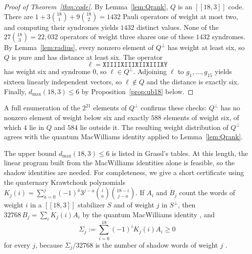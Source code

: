 \documentclass[11pt]{article}
\theoremstyle{definition}
\theoremstyle{remark}
\newcommand{\qc}[1]{[\![#1]\!]}
\begin{document}
\begin{proof}[Proof of Theorem~\ref{thm:code}]
By Lemma~\ref{lem:Qrank}, \(Q\) is an \(\qc{18,3}\) code. There are
\(1+3\binom{18}{1}+9\binom{18}{2}=1432\) Pauli operators of weight at
most two, and computing their syndromes yields \(1432\) distinct values.
None of the \(27\binom{18}{3}=22{,}032\) operators of weight three
shares one of these \(1432\) syndromes. By Lemma~\ref{lem:radius}, every
nonzero element of \(Q^\perp\) has weight at least six, so \(Q\) is pure
and has distance at least six. The operator
\[
 \ell=\texttt{XIIIIXIIIXIIXIIIXY}
\]
has weight six and syndrome \(0\), so \(\ell\in Q^\perp\). Adjoining
\(\ell\) to \(g_1,\ldots,g_{15}\) yields sixteen linearly independent
vectors, so \(\ell\notin Q\) and the distance is exactly six. Finally,
\(d_{\max}(18,3)\leq6\) by Proposition~\ref{prop:ub18} below.
\end{proof}

A full enumeration of the \(2^{21}\) elements of \(Q^\perp\) confirms
these checks: \(Q^\perp\) has no nonzero element of weight below six and
exactly \(588\) elements of weight six, of which \(4\) lie in \(Q\) and
\(584\) lie outside it. The resulting weight distribution of \(Q^\perp\)
agrees with the quantum MacWilliams identity applied to
Lemma~\ref{lem:Qrank}.

The upper bound \(d_{\max}(18,3)\leq6\) is listed in Grassl's tables. At
this length, the linear program built from the MacWilliams identities
alone is feasible, so the shadow identities \cite{rains} are needed. For
completeness, we give a short certificate using the quaternary
Krawtchouk polynomials
\(K_j(i)=\sum_{a=0}^{j}(-1)^a3^{j-a}\binom{i}{a}\binom{18-i}{j-a}\). If
\(A_i\) and \(B_j\) count the words of weight \(i\) in a \(\qc{18,3}\)
stabilizer \(S\) and of weight \(j\) in \(S^\perp\), then
\(32768\,B_j=\sum_iK_j(i)A_i\) by the quantum MacWilliams identity
\cite{shorlaflamme,rains98}, and
\[
 \Sigma_j:=\sum_{i=0}^{18}(-1)^iK_j(i)A_i\geq0
\]
for every \(j\), because \(\Sigma_j/32768\) is the number of shadow
words of weight \(j\) \cite{rains}.
\end{document}
